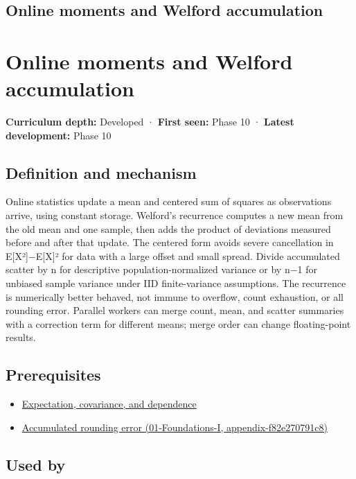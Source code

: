 \hypertarget{appendix-33237f0f618b}{}
\section*{Online moments and Welford accumulation}
\chapter{Online moments and Welford accumulation}\label{appendix-33237f0f618b-online-moments-and-welford-accumulation}

\textbf{Curriculum depth:} Developed · \textbf{First seen:} Phase 10 · \textbf{Latest development:} Phase 10

\section{Definition and mechanism}\label{appendix-33237f0f618b-definition-and-mechanism}

Online statistics update a mean and centered sum of squares as observations arrive, using constant storage. Welford's recurrence computes a new mean from the old mean and one sample, then adds the product of deviations measured before and after that update. The centered form avoids severe cancellation in E{[}X²{]}−E{[}X{]}² for data with a large offset and small spread. Divide accumulated scatter by n for descriptive population-normalized variance or by n−1 for unbiased sample variance under IID finite-variance assumptions. The recurrence is numerically better behaved, not immune to overflow, count exhaustion, or all rounding error. Parallel workers can merge count, mean, and scatter summaries with a correction term for different means; merge order can change floating-point results.

\section{Prerequisites}\label{appendix-33237f0f618b-prerequisites}

\begin{itemize}
\tightlist
\item
  \hyperref[appendix-54c383df9992]{Expectation, covariance, and dependence}
\item
  \href{../01-Foundations-I/main.pdf\#nameddest=appendix-f82e270791c8}{Accumulated rounding error (01-Foundations-I, appendix-f82e270791c8)}
\end{itemize}

\section{Used by}\label{appendix-33237f0f618b-used-by}

